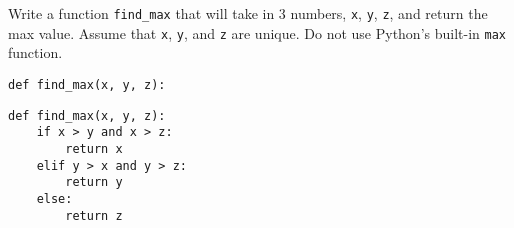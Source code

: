 \begin{blocksection}
\question Write a function \texttt{find\_max} that will take in 3 numbers, \texttt{x}, \texttt{y}, \texttt{z}, and return the max value. Assume that \texttt{x}, \texttt{y}, and \texttt{z} are unique. Do not use Python's built-in \texttt{max} function.

\begin{lstlisting}
def find_max(x, y, z):
\end{lstlisting}
\begin{solution}[2in]
\begin{lstlisting}
def find_max(x, y, z):
    if x > y and x > z:
        return x
    elif y > x and y > z:
        return y
    else:
    	return z
\end{lstlisting}
\end{solution}
\end{blocksection}